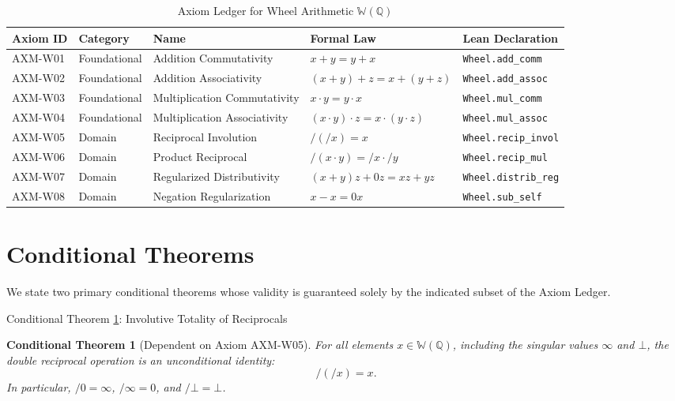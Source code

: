 \documentclass[11pt,a4paper]{article}
\theoremstyle{plain}
\newtheorem{conditionaltheorem}[theorem]{Conditional Theorem}
\theoremstyle{definition}
\theoremstyle{remark}
\newcommand{\W}{\mathbb{W}}
\newcommand{\Q}{\mathbb{Q}}
\newcommand{\bott}{\bot}
\newcommand{\inft}{\infty}
\newcommand{\lean}[1]{\texttt{#1}}
\begin{document}
\begin{table}[htbp]
\centering
\small
\caption{Axiom Ledger for Wheel Arithmetic $\W(\Q)$}
\label{tab:ledger}
\begin{tabularx}{\textwidth}{llllX}
\toprule
\textbf{Axiom ID} & \textbf{Category} & \textbf{Name} & \textbf{Formal Law} & \textbf{Lean Declaration} \\
\midrule
AXM-W01 & Foundational & Addition Commutativity & $x + y = y + x$ & \lean{Wheel.add_comm} \\
AXM-W02 & Foundational & Addition Associativity & $(x + y) + z = x + (y + z)$ & \lean{Wheel.add_assoc} \\
AXM-W03 & Foundational & Multiplication Commutativity & $x \cdot y = y \cdot x$ & \lean{Wheel.mul_comm} \\
AXM-W04 & Foundational & Multiplication Associativity & $(x \cdot y) \cdot z = x \cdot (y \cdot z)$ & \lean{Wheel.mul_assoc} \\
AXM-W05 & Domain & Reciprocal Involution & $/(/x) = x$ & \lean{Wheel.recip_invol} \\
AXM-W06 & Domain & Product Reciprocal & $/(x \cdot y) = /x \cdot /y$ & \lean{Wheel.recip_mul} \\
AXM-W07 & Domain & Regularized Distributivity & $(x+y)z + 0z = xz + yz$ & \lean{Wheel.distrib_reg} \\
AXM-W08 & Domain & Negation Regularization & $x - x = 0x$ & \lean{Wheel.sub_self} \\
\bottomrule
\end{tabularx}
\end{table}

\section{Conditional Theorems}
\label{sec:conditional-theorems}

We state two primary conditional theorems whose validity is guaranteed solely by the indicated subset of the Axiom Ledger.

\begin{claimbox}{Conditional Theorem \ref{thm:recip-invol}: Involutive Totality of Reciprocals}
\begin{conditionaltheorem}[Dependent on Axiom AXM-W05]
\label{thm:recip-invol}
For all elements $x \in \W(\Q)$, including the singular values $\inft$ and $\bott$, the double reciprocal operation is an unconditional identity:
\begin{equation}
/(/x) = x.
\end{equation}
In particular, $/0 = \inft$, $/\inft = 0$, and $/\bott = \bott$.
\end{conditionaltheorem}
\end{claimbox}
\end{document}
